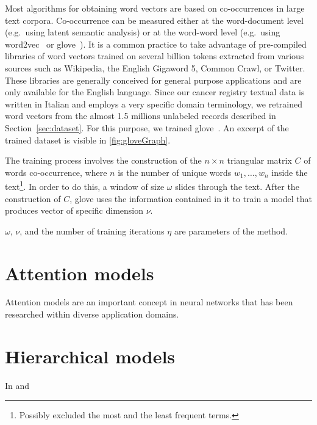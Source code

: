 Most algorithms for obtaining word vectors are based on co-occurrences
in large text corpora. Co-occurrence can be measured either at the
word-document level (e.g.\ using latent semantic analysis) or at the
word-word level (e.g.\ using word2vec~\cite{mikolov_linguistic_2013}
or \ac{glove}~\cite{pennington_glove:_2014}). It is a common practice to
take advantage of pre-compiled libraries of word vectors trained on
several billion tokens extracted from various sources such as
Wikipedia, the English Gigaword 5, Common Crawl, or Twitter. These
libraries are generally conceived for general purpose applications and
are only available for the English language. Since our cancer registry
textual data is written in Italian and employs a very specific domain
terminology, we retrained word vectors from the almost 1.5 millions
unlabeled records described in Section~\ref{sec:dataset}. For this
purpose, we trained \ac{glove}~\cite{pennington_glove:_2014}. An
excerpt of the trained dataset is visible in \cref{fig:gloveGraph}.

The training process involves the construction of the
$n\times n$ triangular matrix $C$ of words co-occurrence, where $n$ is
the number of unique words $w_1,\dots,w_n$ inside the text\footnote{Possibly excluded the
  most and the least frequent terms.}. In order to do this, a window of
size $\omega$ slides
through the text. After the construction of $C$, \ac{glove} uses the
information contained in it to train a model that produces vector of
specific dimension $\nu$.

$\omega$, $\nu$, and the number of
training iterations $\eta$ are parameters of the method. 

\section{Attention models}
Attention models are an important concept in neural networks that has
been researched within diverse application domains.

\section{Hierarchical models}
In \cite{yang_hierarchical_2016} and \cite{wang2019multi}


